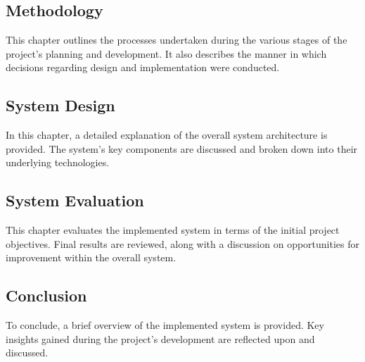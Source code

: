\subsection{Methodology}
This chapter outlines the processes undertaken during the various stages of the project’s planning and development. It also describes the manner in which decisions regarding design and implementation were conducted. 

\subsection{System Design}
In this chapter, a detailed explanation of the overall system architecture is provided. The system’s key components are discussed and broken down into their underlying technologies. 

\subsection{System Evaluation}
This chapter evaluates the implemented system in terms of the initial project objectives. Final results are reviewed, along with a discussion on opportunities for improvement within the overall system.  

\subsection{Conclusion}
To conclude, a brief overview of the implemented system is provided. Key insights gained during the project's development are reflected upon and discussed.